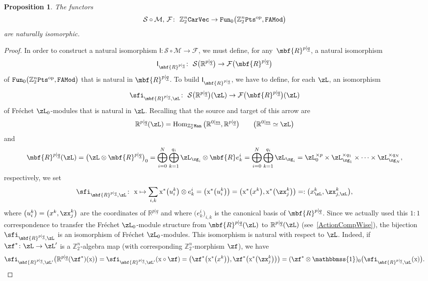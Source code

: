 \documentclass[10pt,a4paper]{amsart}
\newcommand{\Id}{\mathbbmss{1}}
\newcommand{\op}[1]{\operatorname{#1}}
\newcommand{\R}{{\mathbb R}}
\newcommand{\Z}{{\mathbb Z}}
\def\ul{\underline}
\def\cM{\cal M}
\def\cF{\mathcal{F}}
\def\cM{\mathcal{M}}
\def\ul{\underline}
\newcommand{\0}{\otimes}
\newcommand{\z}{\Z_2^n}
\numberwithin{equation}{section}
\newtheorem{Proposition}[Theorem]{Proposition}
 { \theoremstyle{definition}
\newtheorem{Definition}[Theorem]{Definition}
\newtheorem{Example}[Theorem]{Example}
\newtheorem{Remark}[Theorem]{Remark} }
\providecommand{\cal}{\mathcal}
\begin{document}
\begin{Proposition}%
The functors
\[
\mathcal{S}\circ\cM,\, \cF\colon\ \z{\tt CarVec}\to{\tt Fun}_0\big(\z{\tt Pts}^{\op{op}},{\tt FAMod}\big)
\]
are naturally isomorphic.
\end{Proposition}

\newcommand{\rmx}{\mathrm{x}}

\begin{proof}
In order to construct a natural isomorphism $\textsf{I}\colon \mathcal{S}\circ\cM\to\cF$, we must define, for any~$\mbf{R}^{p|\ul q}$, a natural isomorphism
\[
\textsf{I}_{\mbf{R}^{p|\ul q}}\colon\ \mathcal{S}\big(\R^{p|\ul q}\big)\to\cF\big(\mbf{R}^{p|\ul q}\big)
\]
of ${\tt Fun}_0\big(\z{\tt Pts}^{\op{op}},{\tt FAMod}\big)$ that is natural in $\mbf{R}^{p|\ul q}$. To build $\textsf{I}_{\mbf{R}^{p|\ul q}}$, we have to define, for each $\zL$, an isomorphism
\[
\sfi_{\mbf{R}^{p|\ul q},\zL}\colon\ \mathcal{S}\big(\R^{p|\ul q}\big)(\zL)\to \cF\big(\mbf{R}^{p|\ul q}\big)(\zL)
\]
of Fr\'echet $\zL_0$-modules that is natural in $\zL$. Recalling that the source and target of this arrow are
\[
\R^{p|\ul q}(\zL)=\op{Hom}_{\z\tt Man}\big(\R^{0|\ul m},\R^{p|\ul q}\big)\qquad \big(\R^{0|\ul m}\simeq\zL\big)
\]
and
\[
\mbf{R}^{p|\ul q}(\zL)=\big(\zL\0\mbf{R}^{p|\ul q}\big)_0=\bigoplus_{i=0}^N\bigoplus_{k=1}^{q_i}\zL_{\zg_i}\0\mbf{R}e^i_k =\bigoplus_{i=0}^N\bigoplus_{k=1}^{q_i}\zL_{\zg_i}=\zL_0^{\times p}\times\zL_{\zg_1}^{\times q_1}\times\cdots\times\zL_{\zg_N}^{\times q_N},
\]
respectively, we set
\[
\sfi_{\mbf{R}^{p|\ul q},\zL}\colon\ \rmx\mapsto \sum_{i,k}\rmx^*\big(u^k_i\big)\0 e^i_k=\big(\rmx^*\big(u^k_i\big)\big)=\big(\rmx^*\big(x^k\big),\rmx^*\big(\zx^k_j\big)\big) =:\big(x^k_\zL,\zx^k_{j,\zL}\big),
\]
where $\big(u^k_i\big)=\big(x^k,\zx^k_j\big)$ are the coordinates of $\R^{p|\ul q}$ and where $\big(e^i_k\big)_{i,k}$ is the canonical basis of $\mbf{R}^{p|\ul q}$. Since we actually used this $1:1$ correspondence to transfer the Fr\'echet $\zL_0$-module structure from $\mbf{R}^{p|\ul q}(\zL)$ to $\R^{p|\ul q}(\zL)$ (see~\eqref{ActionCompWise}), the bijection $\sfi_{\mbf{R}^{p|\ul q},\zL}$ is an isomorphism of Fr\'echet $\zL_0$-modules. This isomorphism is natural with respect to $\zL$. Indeed, if $\zf^*\colon \zL\to\zL'$ is a $\z$-algebra map (with corresponding $\z$-morphism $\zf$), we have
\begin{gather*}
\sfi_{\mbf{R}^{p|\ul q},\zL'}\big(\R^{p|\ul q}(\zf^*)(\rmx)\big)=\sfi_{\mbf{R}^{p|\ul q},\zL'}(\rmx\circ\zf)=\big(\zf^*\big(\rmx^*\big(x^k\big)\big),\zf^*\big(\rmx^*\big(\zx^k_j\big)\big)\big) =(\zf^*\0\Id)_0\big(\sfi_{\mbf{R}^{p|\ul q},\zL}(\rmx)\big).

\end{gather*}
\end{proof}
\end{document}
